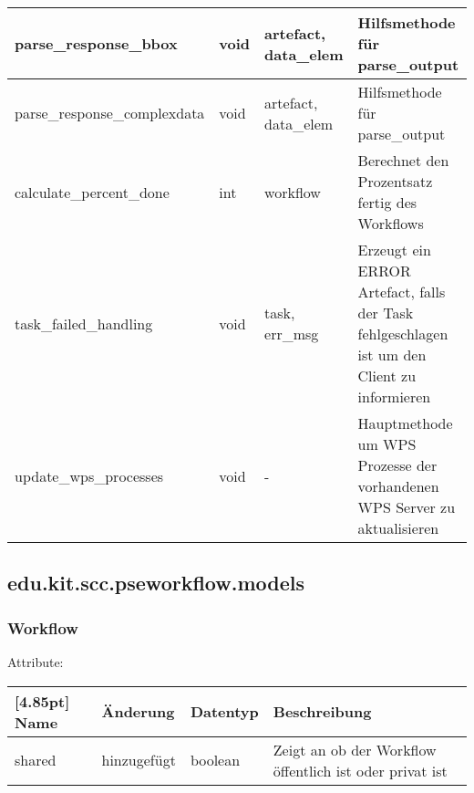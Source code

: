 \begin{center}
\begin{tabularx}{\textwidth}{|l|l|l|X|}
				parse\_response\_bbox & void & \makecell{artefact, \\data\_elem} & Hilfsmethode für parse\_output \\ \hline
				parse\_response\_complexdata & void & \makecell{artefact, \\data\_elem} & Hilfsmethode für parse\_output \\ \hline
				calculate\_percent\_done & int & workflow & Berechnet den Prozentsatz fertig des Workflows \\ \hline
				task\_failed\_handling & void & \makecell{task, \\ err\_msg} & Erzeugt ein ERROR Artefact, falls der Task fehlgeschlagen ist um den Client zu informieren \\ \hline
				update\_wps\_processes & void & - & Hauptmethode um WPS Prozesse der vorhandenen WPS Server zu aktualisieren \\ \hline
			\end{tabularx}
		\end{center}

	
	\newpage

		\subsection{edu.kit.scc.pseworkflow.models}
			\subsubsection{Workflow}
					
			Attribute:
			\begin{center}
				\renewcommand{\arraystretch}{1.5}
				\setlength\tabcolsep{5pt}
				\begin{tabularx}{\textwidth}{|l|l|l|X|}
					\hline
					\rowcolor[gray]{0.75}[4.85pt]					
					Name & Änderung & Datentyp & Beschreibung \\ \hline
					shared & hinzugefügt & boolean & Zeigt an ob der Workflow öffentlich ist oder privat ist\\ \hline
				\end{tabularx}
			\end{center}


